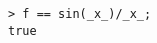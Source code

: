 \begin{center}\begin{minipage}{15cm}\begin{Verbatim}[frame=single]
> f == sin(_x_)/_x_;
true
\end{Verbatim}
\end{minipage}\end{center}
